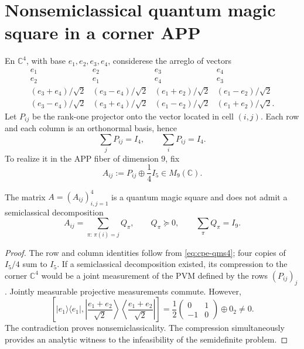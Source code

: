 \section{Nonsemiclassical quantum magic square in a corner APP}
\label{sec:cpe-qms-no-semiclasico}

En \(\mathbb C^4\), with base \(e_1,e_2,e_3,e_4\), considerese the arreglo of
vectors
\[
\begin{array}{cccc}
e_1&e_2&e_3&e_4\\
e_2&e_1&e_4&e_3\\
(e_3+e_4)/\sqrt2&(e_3-e_4)/\sqrt2&(e_1+e_2)/\sqrt2&(e_1-e_2)/\sqrt2\\
(e_3-e_4)/\sqrt2&(e_3+e_4)/\sqrt2&(e_1-e_2)/\sqrt2&(e_1+e_2)/\sqrt2.
\end{array}
\]
Let \(P_{ij}\) be the rank-one projector onto the vector located in
cell \((i,j)\). Each row and each column is an orthonormal basis, hence
\begin{equation}
 \sum_jP_{ij}=I_4,
 \qquad \sum_iP_{ij}=I_4.
 \label{eq:cpe-qms4}
\end{equation}
To realize it in the APP fiber of dimension \(9\), fix
\begin{equation}
 A_{ij}:=P_{ij}\oplus\frac14I_5\in M_9(\mathbb C).
 \label{eq:cpe-qms9}
\end{equation}

\begin{theorem}
\label{thm:cpe-qms-no-semiclasico}
The matrix \(A=(A_{ij})_{i,j=1}^4\) is a quantum magic square and does not admit
a semiclassical decomposition
\[
 A_{ij}=\sum_{\pi:\,\pi(i)=j}Q_\pi,
 \qquad Q_\pi\succeq0,
 \qquad\sum_\pi Q_\pi=I_9.
\]
\end{theorem}

\begin{proof}
The row and column identities follow from
\eqref{eq:cpe-qms4}; four copies of \(I_5/4\) sum to \(I_5\). If a
semiclassical decomposition existed, its compression to the corner \(\mathbb C^4\)
would be a joint measurement of the PVM defined by the rows
\((P_{ij})_j\). Jointly measurable projective measurements commute.
However,
\[
 \left[
 |e_1\rangle\langle e_1|,
 \left|\frac{e_1+e_2}{\sqrt2}\right\rangle
 \left\langle\frac{e_1+e_2}{\sqrt2}\right|
 \right]
 =\frac12
 \begin{pmatrix}0&1\\-1&0\end{pmatrix}
 \oplus0_2\ne0.
\]
The contradiction proves nonsemiclassicality. The compression simultaneously
provides an analytic witness to the infeasibility of the semidefinite problem.
\end{proof}

